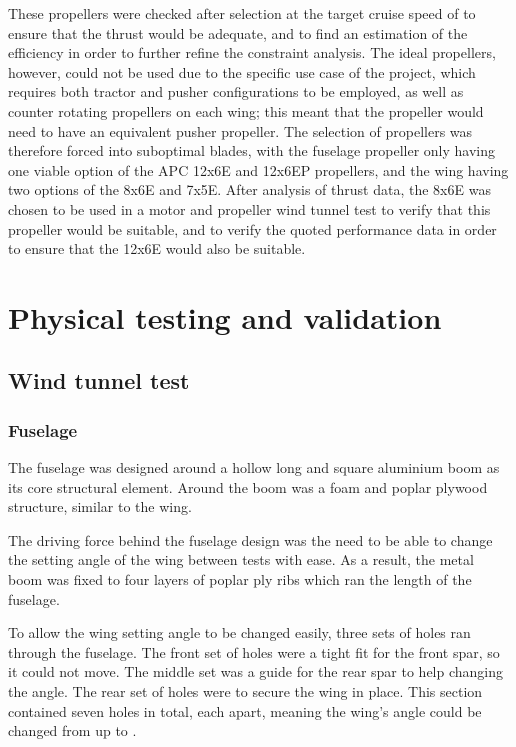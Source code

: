 \documentclass[../../main.tex]{subfiles}
\begin{document}
These propellers were checked after selection at the target cruise speed of  to ensure that the thrust would be adequate, and to find an estimation of the efficiency in order to further refine the constraint analysis.
The ideal propellers, however, could not be used due to the specific use case of the project, which requires both tractor and pusher configurations to be employed, as well as counter rotating propellers on each wing; this meant that the propeller would need to have an equivalent pusher propeller.
The selection of propellers was therefore forced into suboptimal blades, with the fuselage propeller only having one viable option of the APC 12x6E and 12x6EP propellers, and the wing having two options of the 8x6E and 7x5E.
After analysis of thrust data, the 8x6E was chosen to be used in a motor and propeller wind tunnel test to verify that this propeller would be suitable, and to verify the quoted performance data in order to ensure that the 12x6E would also be suitable. 

\section{Physical testing and validation} \label{sec:design-process:physical-testing-and-validation}

\subsection{Wind tunnel test} \label{sec:design-process:interim-design-review:wind-tunnel-test}

\subsubsection{Fuselage} \label{sec:design-process:interim-design-review:wind-tunnel-test:fuselage}

The fuselage was designed around a hollow  long and  square aluminium boom as its core structural element.
Around the boom was a foam and poplar plywood structure, similar to the wing. 

The driving force behind the fuselage design was the need to be able to change the setting angle of the wing between tests with ease.
As a result, the metal boom was fixed to four layers of poplar ply ribs which ran the length of the fuselage. 

To allow the wing setting angle to be changed easily, three sets of holes ran through the fuselage.
The front set of holes were a tight fit for the front spar, so it could not move.
The middle set was a guide for the rear spar to help changing the angle.
The rear set of holes were to secure the wing in place.
This section contained seven holes in total, each  apart, meaning the wing's angle could be changed from  up to . 
\end{document}
